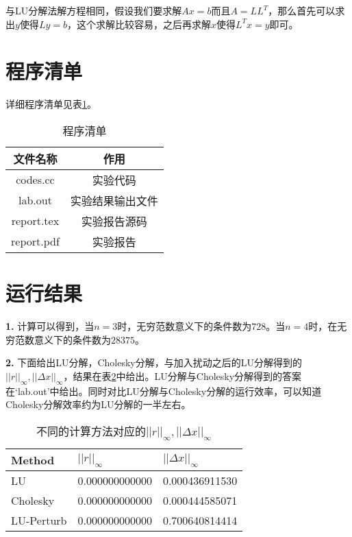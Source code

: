 \documentclass{article}
\theoremstyle{plain}
\theoremstyle{definition}
\theoremstyle{remark}
\begin{document}
与LU分解法解方程相同，假设我们要求解$Ax = b$而且$A = LL^T$，那么首先可以求出$y$使得$Ly = b$，这个求解比较容易，之后再求解$x$使得$L^Tx = y$即可。
    
\section{程序清单}
详细程序清单见表\ref{list}。
\begin{table}[!htbp]
    \centering
    \begin{tabular}{c|c}
        \hline
        \hline
        文件名称 & 作用 \\
        \hline
        codes.cc & 实验代码\\
        lab.out & 实验结果输出文件\\
        report.tex & 实验报告源码\\
        report.pdf & 实验报告\\
        \hline
        \hline
    \end{tabular}
    \caption{程序清单}
    \label{list}
\end{table}

\section{运行结果}
\textbf{1.} 计算可以得到，当$n=3$时，无穷范数意义下的条件数为$728$。当$n=4$时，在无穷范数意义下的条件数为$28375$。

\textbf{2.} 下面给出LU分解，Cholesky分解，与加入扰动之后的LU分解得到的$||r||_{\infty},||\Delta x||_{\infty}$，结果在表\ref{p234res}中给出。LU分解与Cholesky分解得到的答案在`lab.out'中给出。同时对比LU分解与Cholesky分解的运行效率，可以知道Cholesky分解效率约为LU分解的一半左右。

\begin{table}[!htbp]
    \centering
    \begin{tabular}{|l|l|l|}
    \hline\hline
    Method     & $||r||_{\infty}$ & $||\Delta x||_{\infty}$ \\ \hline
    LU         & 0.000000000000   & 0.000436911530          \\
    Cholesky   & 0.000000000000   & 0.000444585071          \\
    LU-Perturb & 0.000000000000   & 0.700640814414          \\ \hline
    \end{tabular}
    \caption{不同的计算方法对应的$||r||_{\infty},||\Delta x||_{\infty}$}
    \label{p234res}
\end{table}
\end{document}
